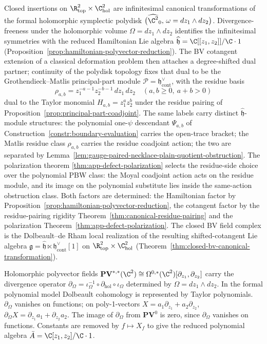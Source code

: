 \documentclass[11pt]{memoir}
\begin{document}
Closed insertions on
$\R^2_{\mathrm{top}}\times\C^2_{\mathrm{hol}}$ are infinitesimal canonical
transformations of the formal holomorphic symplectic polydisk
$\bigl(\widehat{\C^2}_0,\,\omega=dz_1\wedge dz_2\bigr)$. Divergence-freeness
under the holomorphic volume $\Omega=dz_1\wedge dz_2$ identifies the
infinitesimal symmetries with the reduced Hamiltonian Lie algebra
$\widehat{\mathfrak h}=\C[[z_1,z_2]]/\C\cdot 1$
(Proposition~\ref{prop:hamiltonian-polyvector-reduction}). The BV
cotangent extension of a classical deformation problem then attaches a
degree-shifted dual partner; continuity of the polydisk topology fixes
that dual to be the Grothendieck--Matlis principal-part module
$\mathcal P=\mathfrak h^\vee_{\mathrm{cont}}$, with the residue basis
\[
  \rho_{a,b}=z_1^{-a-1}z_2^{-b-1}\,dz_1\,dz_2
  \quad(a,b\ge0,\ a+b>0)
\]
dual to the Taylor monomial \(H_{a,b}=z_1^az_2^b\) under the residue
pairing of Proposition~\ref{prop:principal-part-coadjoint}. The same
labels carry distinct \(\widehat{\mathfrak h}\)-module structures: the
polynomial one-\(\psi\) descendant \(\Psi_{a,b}\) of
Construction~\ref{constr:boundary-evaluation} carries the open-trace
bracket; the Matlis residue class \(\rho_{a,b}\) carries the residue
coadjoint action; the two are separated by
Lemma~\ref{lem:gauge-paired-necklace-plain-quotient-obstruction}. The
polarization theorem
\ref{thm:app-defect-polarization} selects the residue-side choice over
the polynomial PBW class: the Moyal coadjoint action acts on the
residue module, and its image on the polynomial substitute lies
inside the same-action obstruction class.
Both factors are determined: the Hamiltonian factor by
Proposition~\ref{prop:hamiltonian-polyvector-reduction}, the cotangent
factor by the residue-pairing rigidity
Theorem~\ref{thm:canonical-residue-pairing} and the polarization
Theorem~\ref{thm:app-defect-polarization}. The closed BV field complex
is the Dolbeault--de Rham local realization of the resulting
shifted-cotangent Lie algebra
$\mathfrak g=\widehat{\mathfrak h}\ltimes\mathfrak h^\vee_{\mathrm{cont}}[1]$
on $\R^2_{\mathrm{top}}\times\C^2_{\mathrm{hol}}$
(Theorem~\ref{thm:closed-bv-canonical-transformation}).

\begin{rmk}\label{rmk:polyvector-divergence-conventions}
  Holomorphic polyvector fields
  $\mathbf{PV}^{*,*}(\C^2)\cong\Omega^{0,*}(\C^2)[\partial_{z_1},\partial_{z_2}]$
  carry the divergence operator
  $\partial_\Omega
  =\iota_\Omega^{-1}\circ\partial_{\mathrm{hol}}\circ\iota_\Omega$
  determined by $\Omega=dz_1\wedge dz_2$.  In the formal polynomial
  model Dolbeault cohomology is represented by Taylor polynomials.
  $\partial_\Omega$ vanishes on functions; on poly-1-vectors
  $X=a_1\partial_{z_1}+a_2\partial_{z_2}$,
  $\partial_\Omega X=\partial_{z_1}a_1+\partial_{z_2}a_2$.
  The image of \(\partial_\Omega\) from \(\mathbf{PV}^0\) is zero,
  since \(\partial_\Omega\) vanishes on functions.  Constants are removed by
  $f\mapsto X_f$ to give the reduced polynomial algebra
  $\bar A=\C[z_1,z_2]/\C\cdot 1$.
\end{rmk}
\end{document}
